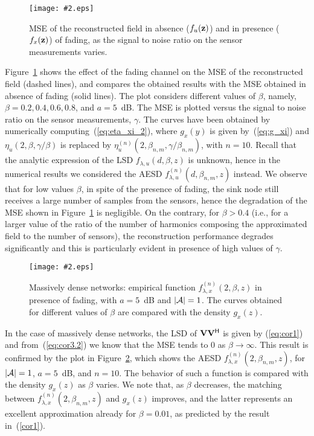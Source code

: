 \documentclass[11pt, draftcls, onecolumn, a4paper]{IEEEtran}
\newcommand{\insertfig}[4]{
\begin{figure}[ht]
\centerline{\texttt{[image: \#2.eps]}}
\caption{#3}\label{#4}\end{figure}}
\newcommand{\zv}{{\bf z}}
\newcommand{\Vm}{{\bf V}}
\newcommand{\Ac}{{\cal A}}
\def\Herm{\mathsf{^H}}
\begin{document}
\insertfig{0.8}{mse}{MSE of the reconstructed field in absence
($f_u(\zv)$) and in presence ($f_x(\zv)$) of fading, as the signal to noise 
ratio on the sensor measurements varies.}{fig:mse}

Figure~\ref{fig:mse} shows the effect of the fading channel on the MSE
of the reconstructed field (dashed lines), and compares the obtained
results with the MSE obtained in absence of fading (solid lines).  The
plot considers different values of $\beta$, namely,
$\beta=0.2,0.4,0.6,0.8$, and $a=5$~dB. The MSE is plotted versus the
signal to noise ratio on the sensor measurements, $\gamma$.  The
curves have been obtained by numerically
computing~(\ref{eq:eta_xi_2}), where $g_x(y)$ is given
by~(\ref{eq:g_xi}) and $\eta_u(2,\beta,\gamma/\beta)$ is replaced by
$\eta^{(n)}_u(2,\beta_{n,m},\gamma/\beta_{n,m})$, with $n=10$.  Recall that the
analytic expression of the LSD $f_{\lambda,u}(d,\beta,z)$ is unknown,
hence in the numerical results we considered the AESD
$f^{(n)}_{\lambda,u}(d,\beta_{n,m},z)$ instead. We observe that for
low values $\beta$, in spite of the presence of fading, the sink node
still receives a large number of samples from the sensors, hence the
degradation of the MSE shown in Figure~\ref{fig:mse} is negligible. On the
contrary, for $\beta> 0.4$ (i.e., for a larger value of the ratio of
the number of harmonics composing the approximated field to the number 
of sensors), the reconstruction performance degrades
significantly and this is particularly evident in presence of high values
of $\gamma$.


\insertfig{0.8}{dense}{Massively dense networks: 
empirical function $f^{(n)}_{\lambda,x}(2,\beta,z)$ 
in presence of fading, 
with $a=5$~dB and $|\Ac|=1$. 
The curves obtained for different values of $\beta$ are compared
with the density $g_{x}(z)$.}{fig:dense}

In the case of massively dense networks, the LSD
of $\Vm\Vm\Herm$ is given by (\ref{eq:cor1}) and from~(\ref{eq:cor3.2}) 
we know that
the MSE tends to 0 as $\beta \rightarrow \infty$. This result is confirmed by
the plot in Figure~\ref{fig:dense}, which shows the AESD $f^{(n)}_{\lambda,x}(2,\beta_{n,m},z)$, for
$|\Ac|=1$, $a=5$~dB, and $n=10$. The behavior of such a function is
compared with the density $g_{x}(z)$ as $\beta$ varies. We note
that, as $\beta$ decreases, the matching between
$f^{(n)}_{\lambda,x}(2,\beta_{n,m},z)$ and $g_{x}(z)$ improves,
and the latter represents an excellent approximation already for
$\beta=0.01$, as predicted by the result in~(\ref{cor1}).
\end{document}
